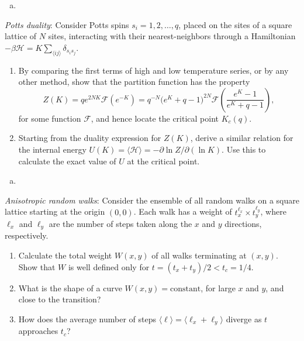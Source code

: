 \begin{solution}
    \begin{enumerate}[(a)]
        \item
    \end{enumerate}
\end{solution}

\begin{problem}
    \textit{Potts duality}: Consider Potts spins $s_i = 1, 2, \ldots, q$, placed on the sites of a square lattice of $N$ sites, interacting with their nearest-neighbors through a Hamiltonian $-\beta\mathcal{H} = K\sum_{\langle ij\rangle}\delta_{s_i s_j}$.

    \begin{enumerate}
        \item[(a)] By comparing the first terms of high and low temperature series, or by any other method, show that the partition function has the property
        \[
            Z(K) = q e^{2NK}\mathcal{F}(e^{-K}) = q^{-N}\bigl(e^K + q - 1\bigr)^{2N}\mathcal{F}\!\left(\frac{e^K - 1}{e^K + q - 1}\right),
        \]
        for some function $\mathcal{F}$, and hence locate the critical point $K_c(q)$.

        \item[(b)] Starting from the duality expression for $Z(K)$, derive a similar relation for the internal energy $U(K) = \langle\mathcal{H}\rangle = -\partial\ln Z/\partial(\ln K)$. Use this to calculate the exact value of $U$ at the critical point.
    \end{enumerate}
\end{problem}

\begin{solution}
    \begin{enumerate}[(a)]
        \item
    \end{enumerate}
\end{solution}

\begin{problem}
    \textit{Anisotropic random walks}: Consider the ensemble of all random walks on a square lattice starting at the origin $(0,0)$. Each walk has a weight of $t_x^{\ell_x}\times t_y^{\ell_y}$, where $\ell_x$ and $\ell_y$ are the number of steps taken along the $x$ and $y$ directions, respectively.

    \begin{enumerate}
        \item[(a)] Calculate the total weight $W(x,y)$ of all walks terminating at $(x,y)$. Show that $W$ is well defined only for $t = (t_x + t_y)/2 < t_c = 1/4$.

        \item[(b)] What is the shape of a curve $W(x,y) = \text{constant}$, for large $x$ and $y$, and close to the transition?

        \item[(c)] How does the average number of steps $\langle\ell\rangle = \langle\ell_x + \ell_y\rangle$ diverge as $t$ approaches $t_c$?
    \end{enumerate}
\end{problem}


